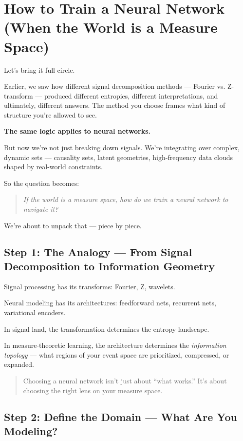 \section{How to Train a Neural Network (When the World is a Measure Space)}

Let’s bring it full circle.

Earlier, we saw how different signal decomposition methods — Fourier vs. Z-transform — produced different entropies, different interpretations, and ultimately, different answers. The method you choose frames what kind of structure you’re allowed to see.

\textbf{The same logic applies to neural networks.}

But now we’re not just breaking down signals. We’re integrating over complex, dynamic sets — causality sets, latent geometries, high-frequency data clouds shaped by real-world constraints.

So the question becomes:

\begin{quote}
\textit{If the world is a measure space, how do we train a neural network to navigate it?}
\end{quote}

We’re about to unpack that — piece by piece.

\subsection{Step 1: The Analogy — From Signal Decomposition to Information Geometry}

Signal processing has its transforms: Fourier, Z, wavelets.

Neural modeling has its architectures: feedforward nets, recurrent nets, variational encoders.

In signal land, the transformation determines the entropy landscape.

In measure-theoretic learning, the architecture determines the \textit{information topology} — what regions of your event space are prioritized, compressed, or expanded.

\begin{quote}
Choosing a neural network isn’t just about “what works.” It’s about choosing the right lens on your measure space.
\end{quote}

\subsection{Step 2: Define the Domain — What Are You Modeling?}

